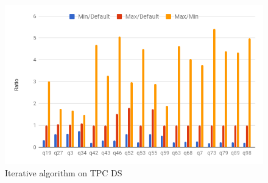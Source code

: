 \begin{figure}[h]
	\includegraphics[width=\linewidth]{fig/tpcds-iterative.png}
	\caption{Iterative algorithm on TPC DS}
	\label{fig:iterativetpcds}
\end{figure}

